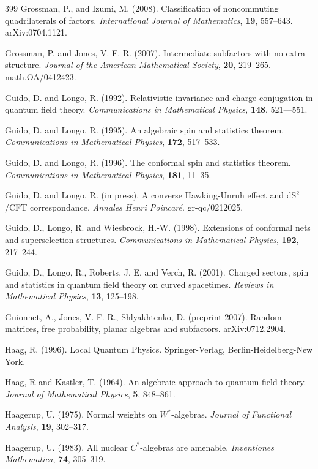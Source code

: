 \documentclass[12pt]{article}
\theoremstyle{plain}
\theoremstyle{definition}
\numberwithin{equation}{section}
\begin{document}
\begin{thebibliography} {399}
Grossman, P., and Izumi, M. (2008).
Classification of noncommuting quadrilaterals of factors.
{\em International Journal of Mathematics},
{\bf 19}, 557--643.
arXiv:0704.1121.

Grossman, P. and Jones, V. F. R. (2007).
Intermediate subfactors with no extra structure.
{\em Journal of the American Mathematical Society},
{\bf 20}, 219--265.
math.OA/0412423.

Guido, D. and  Longo, R. (1992).
Relativistic invariance and
charge conjugation in quantum field theory.
{\em Communications in Mathematical Physics},
{\bf 148}, 521---551.

Guido, D. and  Longo, R. (1995).
An algebraic spin and statistics theorem.
{\em Communications in Mathematical Physics},
{\bf 172}, 517--533.

Guido, D. and  Longo, R. (1996).
The conformal spin and statistics theorem.
{\em Communications in Mathematical Physics},
{\bf 181}, 11--35.

Guido, D. and  Longo, R. (in press).
A converse Hawking-Unruh effect and dS$^2$/CFT correspondance.
{\em Annales Henri Poincar\'e}.
gr-qc/0212025.

Guido, D., Longo, R. and  Wiesbrock, H.-W. (1998).
Extensions of conformal nets and superselection structures.
{\em Communications in Mathematical Physics},
{\bf 192}, 217--244.

Guido, D., Longo, R., Roberts, J. E. and Verch, R. (2001).
Charged sectors, spin and statistics in quantum field theory
on curved spacetimes. 
{\em Reviews in Mathematical Physics}, {\bf 13}, 125--198.

Guionnet, A., Jones, V. F. R.,  Shlyakhtenko, D. (preprint 2007).
Random matrices, free probability, planar algebras and subfactors.
arXiv:0712.2904.

Haag, R. (1996).
Local Quantum Physics.
Springer-Verlag, Berlin-Heidelberg-New York.

Haag, R and Kastler, T. (1964).
An algebraic approach to quantum field theory.
{\em Journal of Mathematical Physics},
{\bf 5}, 848--861.

Haagerup, U. (1975).
Normal weights on $W^*$-algebras.
{\em Journal of Functional Analysis},
{\bf 19}, 302--317.

Haagerup, U. (1983).
All nuclear $C^*$-algebras are amenable.
{\em Inventiones Mathematica}, {\bf 74}, 305--319.


\end{thebibliography}
\end{document}
